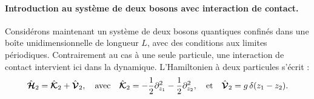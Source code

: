 



\paragraph{Introduction au système de deux bosons avec interaction de contact.}

Considérons maintenant un système de deux bosons quantiques confinés dans une boîte unidimensionnelle de longueur \(L\), avec des conditions aux limites périodiques. Contrairement au cas à une seule particule, une interaction de contact intervient ici dans la dynamique. L’Hamiltonien à deux particules s’écrit :
\begin{eqnarray}
	\hat{\bm{\mathcal{H}}}_2 = \hat{\bm{\mathcal{K}}}_2 + \hat{\bm{\mathcal{V}}}_2, \quad \text{avec} \quad \hat{\bm{\mathcal{K}}}_2 = - \frac{1}{2} \partial_{z_1}^2 - \frac{1}{2} \partial_{z_2}^2, \quad \text{et} \quad \hat{\bm{\mathcal{V}}}_2 = g \, \delta(z_1 - z_2). \label{chap:1:hal.mod.2.part.3}
\end{eqnarray}

